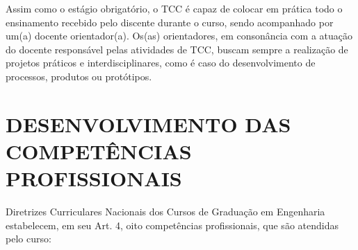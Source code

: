 Assim como o estágio obrigatório, o TCC é capaz de colocar em prática todo o ensinamento recebido pelo discente durante o curso, sendo acompanhado por um(a) docente orientador(a). Os(as) orientadores, em consonância com a atuação do docente responsável pelas atividades de TCC, buscam sempre a realização de projetos práticos e interdisciplinares, como é caso do desenvolvimento de processos, produtos ou protótipos.

\section{DESENVOLVIMENTO DAS COMPETÊNCIAS PROFISSIONAIS}
\label{sec:comp}

Diretrizes Curriculares Nacionais dos Cursos de Graduação em Engenharia \cite{dcneng} estabelecem, em seu Art. 4\textordmasculine{}, oito competências profissionais, que são atendidas pelo curso:

